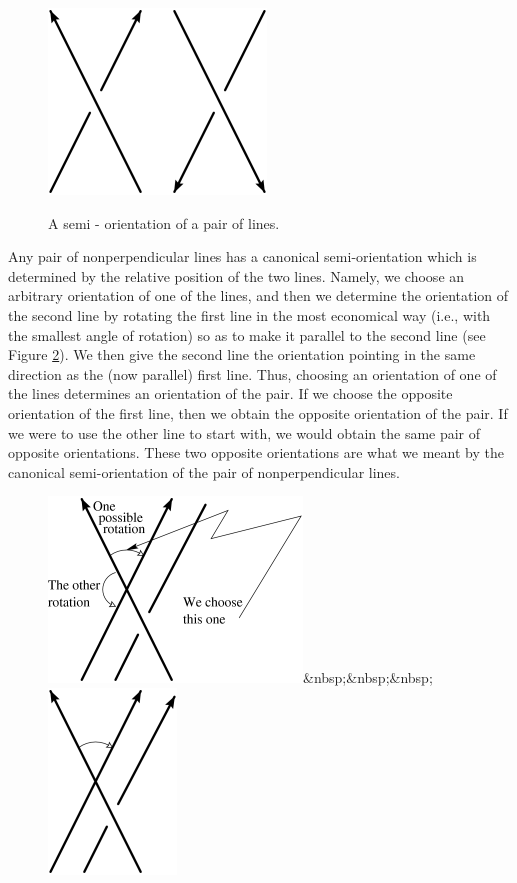 \documentclass{article}
\begin{document}
\begin{figure}
{\includegraphics{imagesSkewlines/x2.png}}
\caption{A semi - orientation of a pair of lines.}
\label{f2}
\end{figure}


Any pair of nonperpendicular lines has a canonical semi-orientation which is
determined by the relative position of the two lines. Namely, we choose an
arbitrary orientation of one of the lines, and then we determine the orientation
of the second line by rotating the first line in the most economical way (i.e.,
with the smallest angle of rotation) so as to make it parallel to the second
line (see Figure \ref{f3}). We then give the second line the 
orientation pointing in
the same direction as the (now parallel) first line. 
Thus, choosing
an orientation of one of the lines determines an orientation of the pair. If we
choose the opposite orientation of the first line, then we obtain the opposite
orientation of the pair. If we were to use the other line to start with, we
would obtain the same pair of opposite orientations.
These two opposite orientations are what we meant by the canonical
semi-orientation of the pair of nonperpendicular lines.

\begin{figure}
{\includegraphics{imagesSkewlines/x3.png}\&nbsp;\&nbsp;\&nbsp; 
\includegraphics{imagesSkewlines/x4.png}}
\caption{}
\label{f3}
\end{figure}
\end{document}
